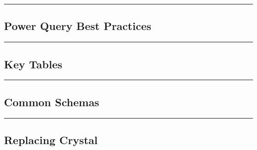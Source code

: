 \documentclass[
]{article}
\begin{document}
\begin{center}\rule{0.5\linewidth}{0.5pt}\end{center}

\hypertarget{power-query-best-practices}{%
\subsection{Power Query Best
Practices}\label{power-query-best-practices}}

\begin{center}\rule{0.5\linewidth}{0.5pt}\end{center}

\hypertarget{key-tables}{%
\subsection{Key Tables}\label{key-tables}}

\begin{center}\rule{0.5\linewidth}{0.5pt}\end{center}

\hypertarget{common-schemas}{%
\subsection{Common Schemas}\label{common-schemas}}

\begin{center}\rule{0.5\linewidth}{0.5pt}\end{center}

\hypertarget{replacing-crystal}{%
\subsection{Replacing Crystal}\label{replacing-crystal}}
\end{document}
